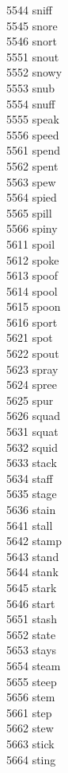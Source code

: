 5544 sniff \\
5545 snore \\
5546 snort \\
5551 snout \\
5552 snowy \\
5553 snub \\
5554 snuff \\
5555 speak \\
5556 speed \\
5561 spend \\
5562 spent \\
5563 spew \\
5564 spied \\
5565 spill \\
5566 spiny \\
5611 spoil \\
5612 spoke \\
5613 spoof \\
5614 spool \\
5615 spoon \\
5616 sport \\
5621 spot \\
5622 spout \\
5623 spray \\
5624 spree \\
5625 spur \\
5626 squad \\
5631 squat \\
5632 squid \\
5633 stack \\
5634 staff \\
5635 stage \\
5636 stain \\
5641 stall \\
5642 stamp \\
5643 stand \\
5644 stank \\
5645 stark \\
5646 start \\
5651 stash \\
5652 state \\
5653 stays \\
5654 steam \\
5655 steep \\
5656 stem \\
5661 step \\
5662 stew \\
5663 stick \\
5664 sting \\
